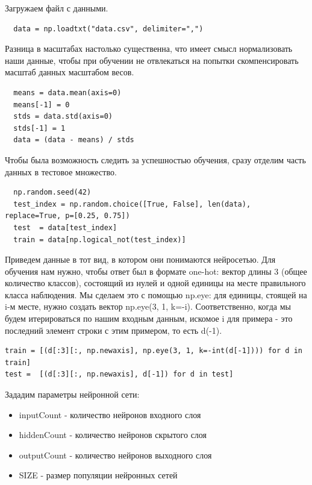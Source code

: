 Загружаем файл с данными.

\begin{lstlisting}
  data = np.loadtxt("data.csv", delimiter=",")
\end{lstlisting}

Разница в масштабах настолько существенна, что имеет смысл нормализовать наши данные, чтобы при обучении не отвлекаться на попытки скомпенсировать масштаб данных масштабом весов.

\begin{lstlisting}
  means = data.mean(axis=0)
  means[-1] = 0 
  stds = data.std(axis=0)
  stds[-1] = 1
  data = (data - means) / stds
\end{lstlisting}

Чтобы была возможность следить за успешностью обучения, сразу отделим часть данных в тестовое множество.

\begin{lstlisting}
  np.random.seed(42)
  test_index = np.random.choice([True, False], len(data), replace=True, p=[0.25, 0.75])
  test  = data[test_index]
  train = data[np.logical_not(test_index)]
\end{lstlisting}

Приведем  данные в тот вид, в котором они понимаются нейросетью. Для обучения нам нужно, чтобы ответ был в формате one-hot: вектор длины 3 (общее количество классов), состоящий из нулей и одной единицы на месте правильного класса наблюдения. Мы сделаем это с помощью np.eye: для единицы, стоящей на i-м месте, нужно создать вектор np.eye(3, 1, k=-i). Соответственно, когда мы будем итерироваться по нашим входным данным, искомое i для примера - это последний элемент строки с этим примером, то есть d(-1). 

\begin{lstlisting}
train = [(d[:3][:, np.newaxis], np.eye(3, 1, k=-int(d[-1]))) for d in train]  
test =  [(d[:3][:, np.newaxis], d[-1]) for d in test]
\end{lstlisting}

Зададим параметры нейронной сети:
\begin{itemize}
  \item inputCount - количество нейронов входного слоя
  \item hiddenCount - количество нейронов скрытого слоя
  \item outputCount - количество нейронов выходного слоя
  \item SIZE - размер популяции нейронных сетей
\end{itemize}


